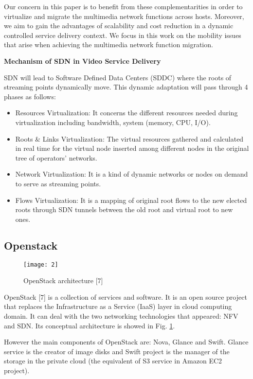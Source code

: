 \documentclass[letterpaper,conference]{IEEEtran}
\begin{document}
Our concern in this paper is to benefit from these
complementarities in order to virtualize and migrate the
multimedia network functions across hosts. Moreover, we aim
to gain the advantages of scalability and cost reduction in a
dynamic controlled service delivery context. We focus in this
work on the mobility issues that arise when achieving the
multimedia network function migration.

\textbf{Mechanism of SDN in Video Service Delivery}

SDN will lead to Software Defined Data Centers (SDDC)
where the roots of streaming points dynamically move. This dynamic adaptation will pass through 4 phases as follows:
\begin{itemize}
\item Resources Virtualization: It concerns the different
resources needed during virtualization including
bandwidth, system (memory, CPU, I/O).
\item Roots \& Links Virtualization: The virtual resources gathered and calculated in real time for the virtual node inserted among different nodes in the original tree of operators’ networks.
\item Network Virtualization: It is a kind of dynamic
networks or nodes on demand to serve as streaming
points.
\item Flows Virtualization: It is a mapping of original root flows to the new elected roots through SDN tunnels between the old root and virtual root to new ones.
\end{itemize}


\subsection{Openstack}

\begin{figure}[t]
\centering
\texttt{[image: 2]}
\caption{OpenStack architecture [7]}
\label{2}
\end{figure}

OpenStack [7] is a collection of services and software. It is an open source project that replaces the Infrastructure as a Service (IaaS) layer in cloud computing domain. It can deal with the two networking technologies that appeared: NFV and SDN. Its conceptual architecture is showed in Fig. \ref{2}.

However the main components of OpenStack are: Nova, Glance and Swift. Glance service is the creator of image disks and Swift project is the manager of the storage in the private cloud (the equivalent of S3 service in Amazon EC2 project).
\end{document}
